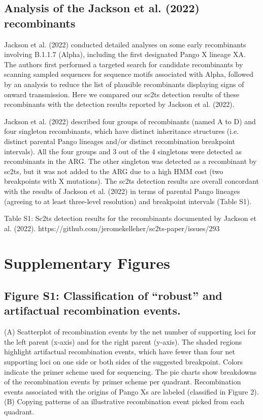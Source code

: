 \documentclass[12pt,letterpaper]{article}
\begin{document}
\subsection*{Analysis of the Jackson et al. (2022) recombinants}
Jackson et al. (2022) conducted detailed analyses on some early recombinants involving B.1.1.7 (Alpha),
including the first designated Pango X lineage XA.
The authors first performed a targeted search for candidate recombinants
by scanning sampled sequences for sequence motifs associated with Alpha,
followed by an analysis to reduce the list of plausible recombinants displaying signs of onward transmission.
Here we compared our sc2ts detection results of these recombinants with the detection results reported by Jackson et al. (2022).

Jackson et al. (2022) described four groups of recombinants (named A to D) and four singleton recombinants,
which have distinct inheritance structures (i.e. distinct parental Pango lineages and/or distinct recombination breakpoint intervals).
All the four groups and 3 out of the 4 singletons were detected as recombinants in the ARG.
The other singleton was detected as a recombinant by sc2ts,
but it was not added to the ARG due to a high HMM cost (two breakpoints with X mutations).
The sc2ts detection results are overall concordant with the results of Jackson et al. (2022) in terms of
parental Pango lineages (agreeing to at least three-level resolution) and breakpoint intervals (Table S1).

Table S1: Sc2ts detection results for the recombinants documented by Jackson et al. (2022).
https://github.com/jeromekelleher/sc2ts-paper/issues/293


\section*{Supplementary Figures}

\subsection*{Figure S1: Classification of “robust” and artifactual recombination events.}
(A) Scatterplot of recombination events by the net number of supporting loci for the left parent (x-axis) and for the right parent (y-axis).
The shaded regions highlight artifactual recombination events,
which have fewer than four net supporting loci on one side or both sides of the suggested breakpoint.
Colors indicate the primer scheme used for sequencing.
The pie charts show breakdowns of the recombination events by primer scheme per quadrant.
Recombination events associated with the origins of Pango Xs are labeled (classified in Figure 2).
(B) Copying patterns of an illustrative recombination event picked from each quadrant.
\end{document}
